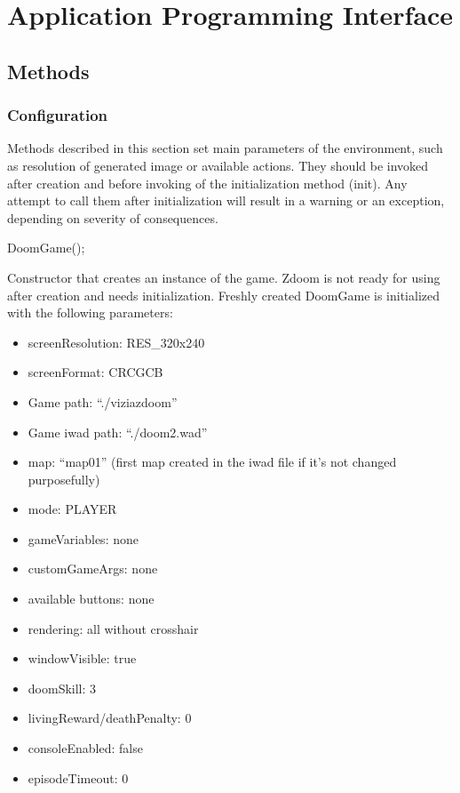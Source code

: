 \chapter{Application Programming Interface}\label{ch:api}
\section{Methods}\label{sec:methods}
	\subsection{Configuration}\label{subsec:config_methods}
	Methods described in this section set main parameters of the environment, such as resolution of generated image or available actions. They should be invoked after creation and before invoking of the initialization method (init). Any attempt to call them after initialization will result in a warning or an exception, depending on severity of consequences. 
	\vspace{20pt}

\begin{clinee}
DoomGame();
\end{clinee}

Constructor that creates an instance of the game. Zdoom is not ready for using after creation and needs initialization. Freshly created DoomGame is initialized with the following parameters:
	\begin{itemize}
		\item screenResolution: RES\_320x240
		\item screenFormat: CRCGCB
		\item Game path: ``./viziazdoom''
		\item Game iwad path: ``./doom2.wad''
		\item map: ``map01'' (first map created in the iwad file if it's not changed purposefully)
		\item mode: PLAYER
		\item gameVariables: none
		\item customGameArgs: none
		\item available buttons: none
		\item rendering: all without crosshair
		\item windowVisible: true 
		\item doomSkill: 3
		\item livingReward/deathPenalty: 0
		\item consoleEnabled: false
		\item episodeTimeout: 0
	\end{itemize}



